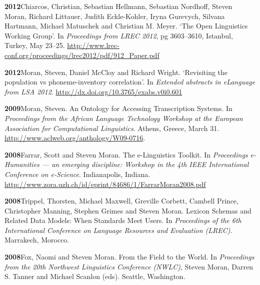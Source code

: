 \documentclass[11pt]{article}
\newcommand{\hangpara}{
 \setlength{\parindent}{0in} %
 \hangindent=0.42in %
}
\begin{document}

\vskip 6pt
\hangpara
{\bf 2012}\hspace{1ex}Chiarcos, Christian, Sebastian Hellmann, Sebastian Nordhoff, Steven Moran, Richard Littauer, Judith Eckle-Kohler, Iryna Gurevych, Silvana Hartmann, Michael Matuschek and Christian M. Meyer.  `The Open Linguistics Working Group'. In {\it Proceedings from LREC 2012}, pg 3603--3610, Istanbul, Turkey, May 23--25. \url{http://www.lrec-conf.org/proceedings/lrec2012/pdf/912_Paper.pdf}

\vskip 6pt
\hangpara
{\bf 2012}\hspace{1ex}Moran, Steven, Daniel McCloy and Richard Wright. `Revisiting the population vs phoneme-inventory correlation'. In {\it Extended abstracts in eLanguage from LSA 2012}. \url{http://dx.doi.org/10.3765/exabs.v0i0.601}

\vskip 6pt
\hangpara
{\bf 2009}\hspace{1ex}Moran, Steven. An Ontology for Accessing Transcription Systems. In {\it Proceedings from the African Language Technology Workshop at the European Association for Computational Linguistics}. Athens, Greece, March 31. \url{http://www.aclweb.org/anthology/W09-0716}. %

\vskip 6pt
\hangpara
{\bf 2008}\hspace{1ex}Farrar, Scott and Steven Moran. The e-Linguistics Toolkit. In {\it Proceedings e-Humanities --- an emerging discipline: Workshop in the 4th IEEE International Conference on e-Science}. Indianapolis, Indiana. \url{http://www.zora.uzh.ch/id/eprint/84686/1/FarrarMoran2008.pdf}

\vskip 6pt
\hangpara
{\bf 2008}\hspace{1ex}Trippel, Thorsten, Michael Maxwell, Greville Corbett, Cambell Prince, Christopher Manning, Stephen Grimes and Steven Moran. Lexicon Schemas and Related Data Models: When Standards Meet Users. In {\it Proceedings of the 6th International Conference on Language Resources and Evaluation (LREC)}. Marrakech, Morocco.

\vskip 6pt
\hangpara
{\bf 2008}\hspace{1ex}Fox, Naomi and Steven Moran. From the Field to the World. In {\it Proceedings from the 20th Northwest Linguistics Conference (NWLC)}, Steven Moran, Darren S. Tanner and Michael Scanlon (eds). Seattle, Washington. %
\end{document}
